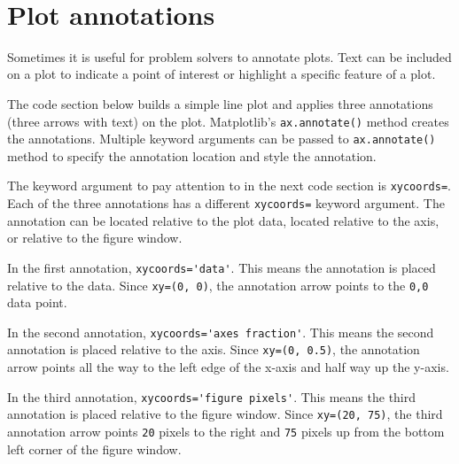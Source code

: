 \documentclass{book}
\newcommand{\passthrough}[1]{#1}
\begin{document}
    \begin{center}
    \end{center}
    { \hspace*{\fill} \\}
    

    
        \hypertarget{plot-annotations}{%
\section{Plot annotations}\label{plot-annotations}}
    




    
        Sometimes it is useful for problem solvers to annotate plots. Text can
be included on a plot to indicate a point of interest or highlight a
specific feature of a plot.
    




    
        The code section below builds a simple line plot and applies three
annotations (three arrows with text) on the plot. Matplotlib's
\passthrough{\lstinline!ax.annotate()!} method creates the annotations.
Multiple keyword arguments can be passed to
\passthrough{\lstinline!ax.annotate()!} method to specify the annotation
location and style the annotation.

The keyword argument to pay attention to in the next code section is
\passthrough{\lstinline!xycoords=!}. Each of the three annotations has a
different \passthrough{\lstinline!xycoords=!} keyword argument. The
annotation can be located relative to the plot data, located relative to
the axis, or relative to the figure window.

In the first annotation, \passthrough{\lstinline!xycoords='data'!}. This
means the annotation is placed relative to the data. Since
\passthrough{\lstinline!xy=(0, 0)!}, the annotation arrow points to the
\passthrough{\lstinline!0,0!} data point.

In the second annotation,
\passthrough{\lstinline!xycoords='axes fraction'!}. This means the
second annotation is placed relative to the axis. Since
\passthrough{\lstinline!xy=(0, 0.5)!}, the annotation arrow points all
the way to the left edge of the x-axis and half way up the y-axis.

In the third annotation,
\passthrough{\lstinline!xycoords='figure pixels'!}. This means the third
annotation is placed relative to the figure window. Since
\passthrough{\lstinline!xy=(20, 75)!}, the third annotation arrow points
\passthrough{\lstinline!20!} pixels to the right and
\passthrough{\lstinline!75!} pixels up from the bottom left corner of
the figure window.
    
\end{document}
